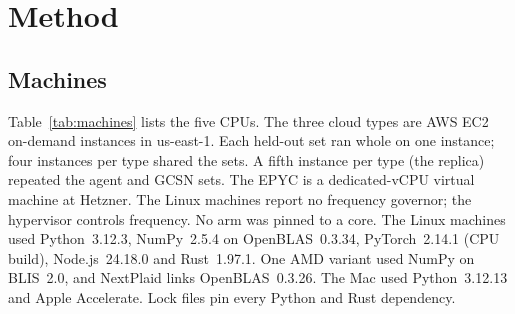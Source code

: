 \section{Method}
\label{sec:method}

\subsection{Machines}

Table~\ref{tab:machines} lists the five CPUs.
The three cloud types are AWS EC2 on-demand instances in us-east-1.
Each held-out set ran whole on one instance; four instances per type shared the sets.
A fifth instance per type (the replica) repeated the agent and GCSN sets.
The EPYC is a dedicated-vCPU virtual machine at Hetzner. The Linux machines report no frequency governor; the hypervisor controls frequency.
No arm was pinned to a core.
The Linux machines used Python~3.12.3, NumPy~2.5.4 on OpenBLAS~0.3.34, PyTorch~2.14.1 (CPU build), Node.js~24.18.0 and Rust~1.97.1.
One AMD variant used NumPy on BLIS~2.0, and NextPlaid links OpenBLAS~0.3.26.
The Mac used Python~3.12.13 and Apple Accelerate.
Lock files pin every Python and Rust dependency.

\begin{table}[!htbp]
\centering\small
\caption{CPUs: physical cores $\times$ hardware threads per core. ``Jobs'': held-out result files (one arm, one set group, one round, one process repetition) that passed the completeness check; the replica in parentheses.}
\label{tab:machines}
\end{table}

